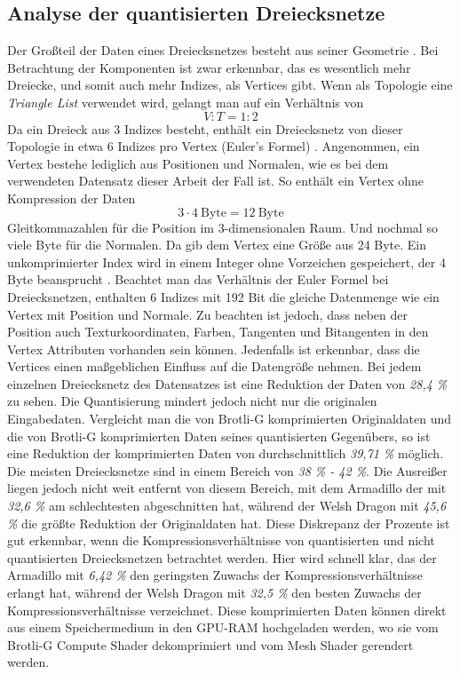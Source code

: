 \subsection{Analyse der quantisierten Dreiecksnetze}
\label{subsec:ana_quantized}
Der Großteil der Daten eines Dreiecksnetzes besteht aus seiner Geometrie \cite{Jakob2017}.
Bei Betrachtung der Komponenten ist zwar erkennbar, das es wesentlich mehr Dreiecke, und somit auch mehr Indizes, als Vertices gibt.
Wenn als Topologie eine \textit{Triangle List} verwendet wird, gelangt man auf ein Verhältnis von 
\begin{equation*}
V:T = 1:2
\end{equation*}
Da ein Dreieck aus 3 Indizes besteht, enthält ein Dreiecksnetz von dieser Topologie in etwa 6 Indizes pro Vertex (Euler's Formel) \cite{Engstad2011}.
Angenommen, ein Vertex bestehe lediglich aus Positionen und Normalen, wie es bei dem verwendeten Datensatz dieser Arbeit der Fall ist.
So enthält ein Vertex ohne Kompression der Daten
\begin{equation*}
3 \cdot 4 \ \text{Byte} = 12 \ \text{Byte}
\end{equation*}
Gleitkommazahlen für die Position im 3-dimensionalen Raum.
Und nochmal so viele Byte für die Normalen.
Da gib dem Vertex eine Größe aus 24 Byte.
Ein unkomprimierter Index wird in einem Integer ohne Vorzeichen gespeichert, der 4 Byte beansprucht \cite{Microsoft2021a}. \newline
Beachtet man das Verhältnis der Euler Formel bei Dreiecksnetzen, enthalten 6 Indizes mit 192 Bit die gleiche Datenmenge wie ein Vertex mit Position und Normale.
Zu beachten ist jedoch, dass neben der Position auch Texturkoordinaten, Farben, Tangenten und Bitangenten in den Vertex Attributen vorhanden sein können. \newline
Jedenfalls ist erkennbar, dass die Vertices einen maßgeblichen Einfluss auf die Datengröße nehmen.
Bei jedem einzelnen Dreiecksnetz des Datensatzes ist eine Reduktion der Daten von \textit{28,4 \%} zu sehen.
Die Quantisierung mindert jedoch nicht nur die originalen Eingabedaten.
Vergleicht man die von Brotli-G komprimierten Originaldaten und die von Brotli-G komprimierten Daten seines quantisierten Gegenübers, so ist eine Reduktion der komprimierten Daten von durchschnittlich \textit{39,71 \%} möglich.
Die meisten Dreiecksnetze sind in einem Bereich von \textit{38 \% - 42 \%}.
Die Ausreißer liegen jedoch nicht weit entfernt von diesem Bereich, mit dem Armadillo der mit \textit{32,6 \%} am schlechtesten abgeschnitten hat, während der Welsh Dragon mit \textit{45,6 \%} die größte Reduktion der Originaldaten hat.
Diese Diskrepanz der Prozente ist gut erkennbar, wenn die Kompressionsverhältnisse von quantisierten und nicht quantisierten Dreiecksnetzen betrachtet werden.
Hier wird schnell klar, das der Armadillo mit \textit{6,42 \%} den geringsten Zuwachs der Kompressionsverhältnisse erlangt hat, während der Welsh Dragon mit \textit{32,5 \%} den besten Zuwachs der Kompressionsverhältnisse verzeichnet.
Diese komprimierten Daten können direkt aus einem Speichermedium in den GPU-RAM hochgeladen werden, wo sie vom Brotli-G Compute Shader dekomprimiert und vom Mesh Shader gerendert werden. \newline

